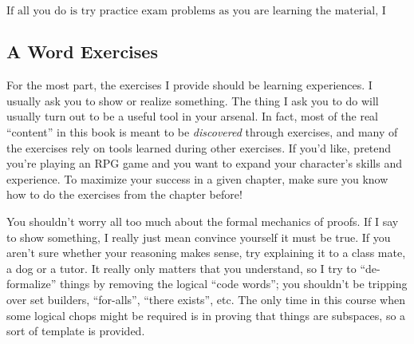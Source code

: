 \[\mbox{If all you do is try practice exam problems as you are learning the material, I think you will succeed.}\]

\subsection*{A Word Exercises}

For the most part, the exercises I provide should be learning experiences.
I usually ask you to show or realize something.
The thing I ask you to do will usually turn out to be a useful tool in your arsenal.
In fact, most of the real ``content'' in this book is meant to be \emph{discovered} through exercises, and many of the exercises rely on tools learned during other exercises.
If you'd like, pretend you're playing an RPG game and you want to expand your character's skills and experience.
To maximize your success in a given chapter, make sure you know how to do the exercises from the chapter before!

You shouldn't worry all too much about the formal mechanics of proofs.
If I say to show something, I really just mean convince yourself it must be true.  
If you aren't sure whether your reasoning makes sense, try explaining it to a class mate, a dog or a tutor.
It really only matters that you understand, so I try to ``de-formalize'' things by removing the logical ``code words''; you shouldn't be tripping over set builders, ``for-alls'', ``there exists'', etc.
The only time in this course when some logical chops might be required is in proving that things are subspaces, so a sort of template is provided.  

